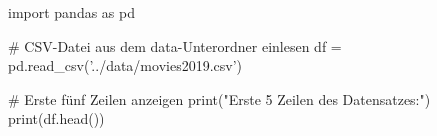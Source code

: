 import pandas as pd

# CSV-Datei aus dem data-Unterordner einlesen
df = pd.read_csv('../data/movies2019.csv')

# Erste fünf Zeilen anzeigen
print("Erste 5 Zeilen des Datensatzes:")
print(df.head())